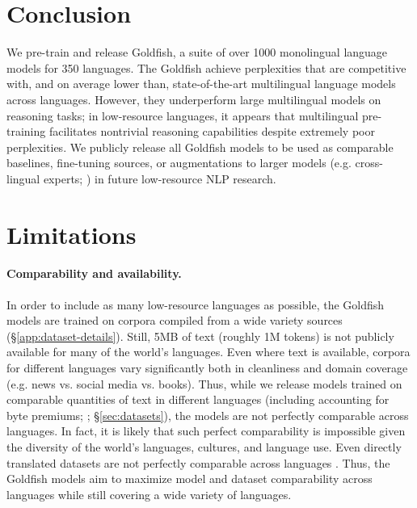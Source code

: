 \documentclass[11pt]{article}
\begin{document}
\section{Conclusion}
We pre-train and release Goldfish, a suite of over 1000 monolingual language models for 350 languages.
The Goldfish achieve perplexities that are competitive with, and on average lower than, state-of-the-art multilingual language models across languages.
However, they underperform large multilingual models on reasoning tasks; in low-resource languages, it appears that multilingual pre-training facilitates nontrivial reasoning capabilities despite extremely poor perplexities.
We publicly release all Goldfish models to be used as comparable baselines, fine-tuning sources, or augmentations to larger models (e.g. cross-lingual experts; \citealp{blevins2024breakingcursemultilingualitycrosslingual}) in future low-resource NLP research.

\section*{Limitations}

\paragraph{Comparability and availability.}
In order to include as many low-resource languages as possible, the Goldfish models are trained on corpora compiled from a wide variety sources (\S\ref{app:dataset-details}).
Still, 5MB of text (roughly 1M tokens) is not publicly available for many of the world's languages.
Even where text is available, corpora for different languages vary significantly both in cleanliness and domain coverage (e.g. news vs. social media vs. books).
Thus, while we release models trained on comparable quantities of text in different languages (including accounting for byte premiums; \citealp{arnett2024bit}; \S\ref{sec:datasets}), the models are not perfectly comparable across languages.
In fact, it is likely that such perfect comparability is impossible given the diversity of the world's languages, cultures, and language use.
Even directly translated datasets are not perfectly comparable across languages \citep{untranslatability}.
Thus, the Goldfish models aim to maximize model and dataset comparability across languages while still covering a wide variety of languages.
\end{document}
